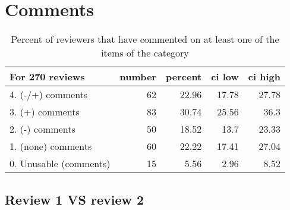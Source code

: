 \documentclass{article}
\begin{document}
\section{Comments} 

\begin{table}[H]

\centering

\begin{tabular}{lrrrr}
\hline
 For 270 reviews        &   number &   percent &   ci low &   ci high \\
\hline
 4. (-/+) comments      &       62 &     22.96 &    17.78 &     27.78 \\
 3. (+) comments        &       83 &     30.74 &    25.56 &     36.3  \\
 2. (-) comments        &       50 &     18.52 &    13.7  &     23.33 \\
 1. (none) comments     &       60 &     22.22 &    17.41 &     27.04 \\
 0. Unusable (comments) &       15 &      5.56 &     2.96 &      8.52 \\
\hline
\end{tabular}\caption{Percent of reviewers that have commented on at least one of the items of the category}

\end{table}



\subsection{Review 1 VS review 2} 
\end{document}
